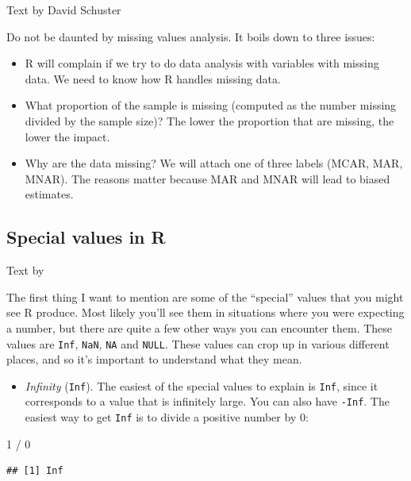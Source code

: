 \documentclass[
]{book}
\newenvironment{Shaded}{\begin{snugshade}}{\end{snugshade}}
\newcommand{\DecValTok}[1]{\textcolor[rgb]{0.00,0.00,0.81}{#1}}
\newcommand{\SpecialCharTok}[1]{\textcolor[rgb]{0.00,0.00,0.00}{#1}}
\providecommand{\tightlist}{%
  \setlength{\itemsep}{0pt}\setlength{\parskip}{0pt}}
\begin{document}
Text by David Schuster

Do not be daunted by missing values analysis. It boils down to three issues:

\begin{itemize}
\item
  R will complain if we try to do data analysis with variables with missing data. We need to know how R handles missing data.
\item
  What proportion of the sample is missing (computed as the number missing divided by the sample size)? The lower the proportion that are missing, the lower the impact.
\item
  Why are the data missing? We will attach one of three labels (MCAR, MAR, MNAR). The reasons matter because MAR and MNAR will lead to biased estimates.
\end{itemize}

\hypertarget{specials}{%
\subsection{Special values in R}\label{specials}}

Text by \citet{Navarro2018}

The first thing I want to mention are some of the ``special'' values that you might see R produce. Most likely you'll see them in situations where you were expecting a number, but there are quite a few other ways you can encounter them. These values are \texttt{Inf}, \texttt{NaN}, \texttt{NA} and \texttt{NULL}. These values can crop up in various different places, and so it's important to understand what they mean.

\begin{itemize}
\tightlist
\item
  \emph{Infinity} (\texttt{Inf}). The easiest of the special values to explain is \texttt{Inf}, since it corresponds to a value that is infinitely large. You can also have \texttt{-Inf}. The easiest way to get \texttt{Inf} is to divide a positive number by 0:
\end{itemize}

\begin{Shaded}
\begin{Highlighting}[]
\DecValTok{1} \SpecialCharTok{/} \DecValTok{0}
\end{Highlighting}
\end{Shaded}

\begin{verbatim}
## [1] Inf
\end{verbatim}
\end{document}
